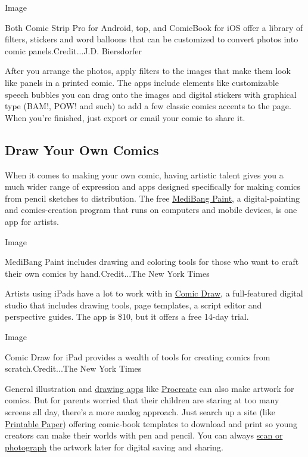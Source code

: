 Image

Both Comic Strip Pro for Android, top, and ComicBook for iOS offer a
library of filters, stickers and word balloons that can be customized to
convert photos into comic panels.Credit...J.D. Biersdorfer

After you arrange the photos, apply filters to the images that make them
look like panels in a printed comic. The apps include elements like
customizable speech bubbles you can drag onto the images and digital
stickers with graphical type (BAM!, POW! and such) to add a few classic
comics accents to the page. When you're finished, just export or email
your comic to share it.

\hypertarget{draw-your-own-comics}{%
\subsection{Draw Your Own Comics}\label{draw-your-own-comics}}

When it comes to making your own comic, having artistic talent gives you
a much wider range of expression and apps designed specifically for
making comics from pencil sketches to distribution. The free
\href{https://medibangpaint.com/en/}{MediBang Paint}, a digital-painting
and comics-creation program that runs on computers and mobile devices,
is one app for artists.

Image

MediBang Paint includes drawing and coloring tools for those who want to
craft their own comics by hand.Credit...The New York Times

Artists using iPads have a lot to work with in
\href{https://plasq.com/apps/comicdraw/ios/}{Comic Draw}, a
full-featured digital studio that includes drawing tools, page
templates, a script editor and perspective guides. The app is \$10, but
it offers a free 14-day trial.

Image

Comic Draw for iPad provides a wealth of tools for creating comics from
scratch.Credit...The New York Times

General illustration and
\href{https://www.nytimes3xbfgragh.onion/2019/09/04/technology/personaltech/how-to-draw-with-apps.html}{drawing
apps} like \href{https://procreate.art/}{Procreate} can also make
artwork for comics. But for parents worried that their children are
staring at too many screens all day, there's a more analog approach.
Just search up a site (like
\href{https://www.printablepaper.net/category/comics}{Printable Paper})
offering comic-book templates to download and print so young creators
can make their worlds with pen and pencil. You can always
\href{https://www.nytimes3xbfgragh.onion/2020/04/01/technology/personaltech/digitizing-important-documents.html}{scan
or photograph} the artwork later for digital saving and sharing.

